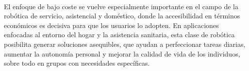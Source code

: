 \

El enfoque de bajo coste se vuelve especialmente importante en el campo de la robótica de servicio, asistencial y doméstico, donde la accesibilidad en términos económicos es decisiva para que los usuarios lo adopten. En aplicaciones enfocadas al entorno del hogar y la asistencia sanitaria, esta clase de robótica posibilita generar soluciones asequibles, que ayudan a perfeccionar tareas diarias, aumentar la autonomía personal y mejorar la calidad de vida de los individuos, sobre todo en grupos con necesidades específicas.\\








